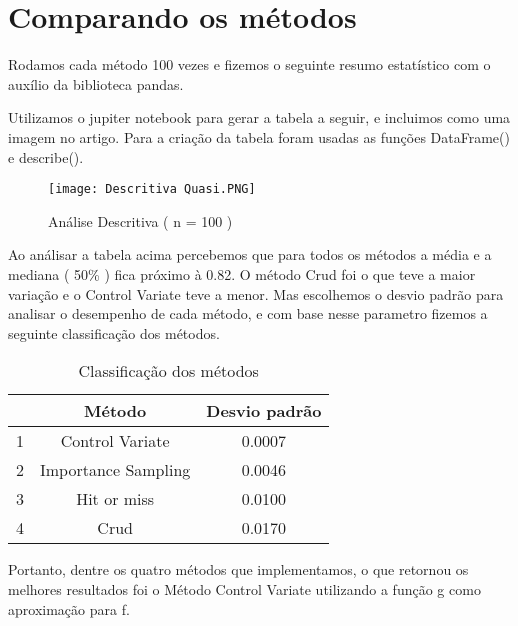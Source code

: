 \documentclass{article}
\begin{document}
\section{Comparando os métodos}

Rodamos cada método 100 vezes e fizemos o seguinte resumo estatístico com o auxílio da biblioteca pandas. 
\par 
Utilizamos o jupiter notebook para gerar a tabela a seguir, e incluimos como uma imagem no artigo. Para a criação da tabela foram usadas as funções DataFrame() e describe().

\hfill


\begin{figure}[!htb]
    \centering
    \texttt{[image: Descritiva Quasi.PNG]}
    \caption{Análise Descritiva ( n = 100 )}
    \label{fig:my_label}
\end{figure}

\hfill

\par
Ao análisar a tabela acima percebemos que para todos os métodos a média e a mediana ( 50\% ) fica próximo à 0.82. O método Crud foi o que teve a maior variação e o Control Variate teve a menor. Mas escolhemos o desvio padrão para analisar o desempenho de cada método, e com base nesse parametro fizemos a seguinte classificação dos métodos.

\hfill


\begin{table}[ht]
    \centering
    \begin{tabular}{c|c|c}
         & Método & Desvio padrão \\
         \hline
        1 & Control Variate & 0.0007 \\
        \hline
        2 & Importance Sampling & 0.0046 \\
        \hline
        3 & Hit or miss & 0.0100 \\
        \hline
        4 & Crud & 0.0170 \\
        
    \end{tabular}
    \caption{Classificação dos métodos}
    \label{tab:my_label}
\end{table}

\hfill

\par 
Portanto, dentre os quatro métodos que implementamos, o que retornou os melhores resultados foi o Método Control Variate utilizando a função g como aproximação para f.
\end{document}
